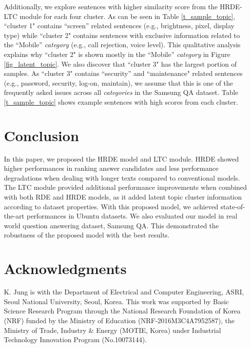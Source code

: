 \documentclass[11pt,a4paper]{article}
\begin{document}
Additionally, we explore sentences with higher similarity score from the HRDE-LTC module for each four cluster. 
As can be seen in Table \ref{t_sample_topic}, ``cluster 1" contains ``screen'' related sentences (e.g., brightness, pixel, display type) while ``cluster 2" contains sentences with exclusive information related to the ``Mobile'' \textit{category} (e.g., call rejection, voice level). This qualitative analysis explains why ``cluster 2" is shown mostly in the ``Mobile'' \textit{category} in Figure \ref{fig_latent_topic}. We also discover that ``cluster 3" has the largest portion of samples. 
As ``cluster 3" contains ``security'' and ``maintenance"  related sentences (e.g., password, security, log-on, maintain), we assume that this is one of the frequently asked issues across all \textit{categories} in the Samsung QA dataset.  Table \ref{t_sample_topic} shows example sentences with high scores from each cluster.


\section{Conclusion}
\label{coclusion}
In this paper, we proposed the HRDE model and LTC module. HRDE showed higher performances in ranking answer candidates and less performance degradations when dealing with longer texts compared to conventional models. 
The LTC module provided additional performance improvements when combined with both RDE and HRDE models, as it added latent topic cluster information according to dataset properties.
With this proposed model, we achieved state-of-the-art performances in Ubuntu datasets.
We also evaluated our model in real world question answering dataset, Samsung QA. This demonstrated the robustness of the proposed model with the best results.


\section*{Acknowledgments}
K. Jung is with the Department of Electrical and Computer Engineering, ASRI, Seoul National University, Seoul, Korea. This work was supported by Basic Science Research Program through the National Research Foundation of Korea (NRF) funded by the Ministry of Education (NRF-2016M3C4A7952587), the Ministry of Trade, Industry \& Energy (MOTIE, Korea) under Industrial Technology Innovation Program (No.10073144).





\end{document}
